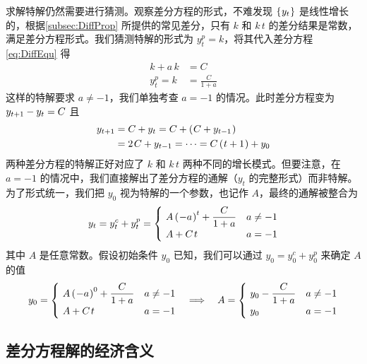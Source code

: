 求解特解仍然需要进行猜测。观察差分方程的形式，不难发现 \(\left\{\mspace{1mu} y_t\mspace{1mu}\right\}\) 是线性增长的，根据\ref{subsec:DiffProp} 所提供的常见差分，只有 \(k\) 和 \(k\,t\) 的差分结果是常数，满足差分方程形式。我们猜测特解的形式为 \(y_t^p=k\)，将其代入差分方程 \ref{eq:DiffEqu} 得
\begin{align}
    k + a\,k&=C\\
    y_t^p=k&=\frac C{1+a}
\end{align}
这样的特解要求 \(a\neq -1\)，我们单独考查 \(a=-1\) 的情况。此时差分方程变为 \(y_{t+1}-y_t=C\) 且
\begin{align}
    y\nt &= C + y_t = C + \bka{C + y\lt} \notag\\
    &= 2\,C + y\lt = \cdots = C\bka{t+1} + y_0
\end{align}
两种差分方程的特解正好对应了 \(k\) 和 \(k\,t\) 两种不同的增长模式。但要注意，在 \(a=-1\) 的情况中，我们直接解出了差分方程的通解（\(y_t\) 的完整形式）而非特解。为了形式统一，我们把 \(y_0\) 视为特解的一个参数，也记作 \(A\)，最终的通解被整合为
\begin{equation}
    y_t=y_t^c+y_t^p=\begin{cases}
        \ A\bka{-a}^{t}+\dfrac C{1+a} & a\neq -1\\
        \ A+C\,t & a=-1
    \end{cases}
\end{equation}
其中 \(A\) 是任意常数。假设初始条件 \(y_0\) 已知，我们可以通过 \(y_0=y_0^c+y_0^p\) 来确定 \(A\) 的值
\begin{equation}
    y_0=\begin{cases}
        \ A\bka{-a}^0 + \dfrac C{1+a} & a\neq -1\\
        \ A+C\,t & a=-1
    \end{cases} \quad \Longrightarrow \quad A=\begin{cases}
        \ y_0-\dfrac C{1+a} & a\neq -1\\
        \ y_0 & a=-1
    \end{cases}\label{eq:DiffEquA}
\end{equation}


\subsection{差分方程解的经济含义}\label{subsec:DiffEquSolnMean}

